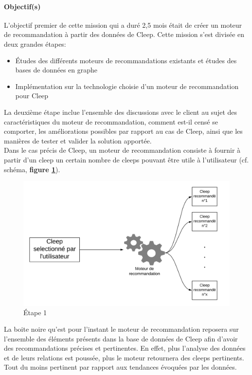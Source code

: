 \documentclass{article} %
\begin{document}
\paragraph{Objectif(s)\\}

L'objectif premier de cette mission qui a duré 2,5 mois était de créer un moteur de recommandation à partir des données de Cleep. Cette mission s'est divisée en deux grandes étapes:
\begin{itemize}
 \itemsep 0em
 \item Études des différents moteurs de recommandations existants et études des bases de données en graphe
 \item Implémentation sur la technologie choisie d'un moteur de recommandation pour Cleep
\end{itemize}
La deuxième étape inclue l'ensemble des discussions avec le client au sujet des caractéristiques du moteur de recommandation, comment est-il censé se comporter, les améliorations possibles par rapport au cas de Cleep, ainsi que les manières de tester et valider la solution apportée.\\
Dans le cas précis de Cleep, un moteur de recommandation consiste à fournir à partir d'un cleep un certain nombre de cleeps pouvant être utile à l'utilisateur (cf. schéma, \textbf{figure \ref{fig:reco}}). 

\begin{figure}[!h]
 \centering
 \includegraphics[keepaspectratio = true,scale=0.4]{reco.png}
 \caption{Étape 1}
 \label{fig:reco}
\end{figure}

La boite noire qu'est pour l'instant le moteur de recommandation reposera sur l'ensemble des éléments présents dans la base de données de Cleep afin d'avoir des recommandations précises et pertinentes. En effet, plus l'analyse des données et de leurs relations est poussée, plus le moteur retournera des cleeps pertinents. Tout du moins pertinent par rapport aux tendances évoquées par les données.
\end{document}
